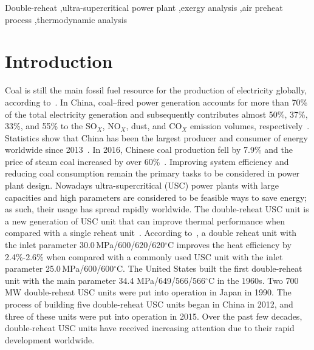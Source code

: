 \documentclass[preprint,12pt]{elsarticle}
\begin{document}
\begin{frontmatter}
\begin{abstract}
\end{abstract}

\begin{keyword}
Double-reheat \sep ultra-supercritical power plant \sep exergy analysis \sep air preheat process \sep thermodynamic analysis
\end{keyword}

\end{frontmatter}

\begin{multicols}{2}
\printnomenclature[1.5cm]{}
\end{multicols}



\section{Introduction}
\label{sec1:intro}
Coal is still the main fossil fuel resource for the production of electricity globally, according to~\cite{Ouedraogo2013Energy}. 
In China, coal–fired power generation accounts for more than 70\% of the total electricity generation and subsequently contributes almost 50\%, 37\%, 33\%, and 55\% to the SO$_X$, NO$_X$, dust, and CO$_X$ emission volumes, respectively~\cite{Zhang2010Analysis}.
Statistics show that China has been the largest producer and consumer of energy worldwide since 2013~\cite{Petroleum2014BP}. 
In 2016, Chinese coal production fell by 7.9\% and the price of steam coal increased by over 60\%~\cite{Petroleum2017BP}. 
Improving system efficiency and reducing coal consumption remain the primary tasks to be considered in power plant design. Nowadays ultra-supercritical (USC) power plants with large capacities and high parameters are considered to be feasible ways to save energy; as such, their usage has spread rapidly worldwide.
The double-reheat USC unit is a new generation of USC unit that can improve thermal performance when compared with a single reheat unit~\cite{Zhao2017Exergy}. 
According to~\cite{Zhao2017Exergy}, a double reheat unit with the inlet parameter 30.0\,MPa/600/620/620$^\circ$C improves the heat efficiency by 2.4\%-2.6\% when compared with a commonly used USC unit with the inlet parameter 25.0\,MPa/600/600$^\circ$C.
 The United States built the first double-reheat unit with the main parameter 34.4 MPa/649/566/566$^\circ$C in the 1960s.
 Two 700 MW double-reheat USC units were put into operation in Japan in 1990. 
 The process of building five double-reheat USC units began in China in 2012, and three of these units were put into operation in 2015.
 Over the past few decades, double-reheat USC units have received increasing attention due to their rapid development worldwide.
\end{document}
